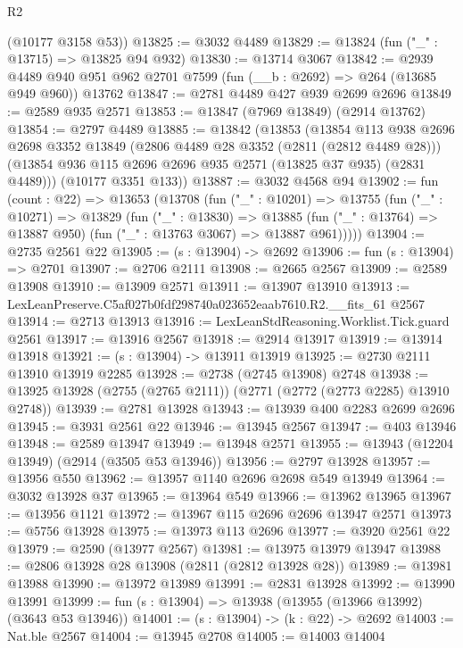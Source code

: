 \begin{lexlean}{R2}
\begin{coremodule}
      (@10177 @3158 @53))
@13825 := @3032 @4489
@13829 := @13824 (fun ("_" : @13715) => @13825 @94 @932)
@13830 := @13714 @3067
@13842 := @2939
    @4489
    @940
    @951
    @962
    @2701
    @7599
    (fun (__b : @2692) => @264 (@13685 @949 @960))
    @13762
@13847 := @2781 @4489 @427 @939 @2699 @2696
@13849 := @2589 @935 @2571
@13853 := @13847 (@7969 @13849) (@2914 @13762)
@13854 := @2797 @4489
@13885 := @13842
    (@13853
      (@13854
        @113
        @938
        @2696
        @2698
        @3352
        @13849
        (@2806 @4489 @28 @3352 (@2811 (@2812 @4489 @28)))
        (@13854 @936 @115 @2696 @2696 @935 @2571 (@13825 @37 @935) (@2831 @4489)))
      (@10177 @3351 @133))
@13887 := @3032 @4568 @94
@13902 := fun (count : @22) =>
  @13653
    (@13708
      (fun ("_" : @10201) =>
      @13755
        (fun ("_" : @10271) =>
        @13829
          (fun ("_" : @13830) =>
          @13885 (fun ("_" : @13764) => @13887 @950) (fun ("_" : @13763 @3067) => @13887 @961)))))
@13904 := @2735 @2561 @22
@13905 := (s : @13904) -> @2692
@13906 := fun (s : @13904) => @2701
@13907 := @2706 @2111
@13908 := @2665 @2567
@13909 := @2589 @13908
@13910 := @13909 @2571
@13911 := @13907 @13910
@13913 := LexLeanPreserve.C5af027b0fdf298740a023652eaab7610.R2.__fits_61 @2567
@13914 := @2713 @13913
@13916 := LexLeanStdReasoning.Worklist.Tick.guard @2561
@13917 := @13916 @2567
@13918 := @2914 @13917
@13919 := @13914 @13918
@13921 := (s : @13904) -> @13911 @13919
@13925 := @2730 @2111 @13910 @13919 @2285
@13928 := @2738 (@2745 @13908) @2748
@13938 := @13925 @13928 (@2755 (@2765 @2111)) (@2771 (@2772 (@2773 @2285) @13910 @2748))
@13939 := @2781 @13928
@13943 := @13939 @400 @2283 @2699 @2696
@13945 := @3931 @2561 @22
@13946 := @13945 @2567
@13947 := @403 @13946
@13948 := @2589 @13947
@13949 := @13948 @2571
@13955 := @13943 (@12204 @13949) (@2914 (@3505 @53 @13946))
@13956 := @2797 @13928
@13957 := @13956 @550
@13962 := @13957 @1140 @2696 @2698 @549 @13949
@13964 := @3032 @13928 @37
@13965 := @13964 @549
@13966 := @13962 @13965
@13967 := @13956 @1121
@13972 := @13967 @115 @2696 @2696 @13947 @2571
@13973 := @5756 @13928
@13975 := @13973 @113 @2696
@13977 := @3920 @2561 @22
@13979 := @2590 (@13977 @2567)
@13981 := @13975 @13979 @13947
@13988 := @2806 @13928 @28 @13908 (@2811 (@2812 @13928 @28))
@13989 := @13981 @13988
@13990 := @13972 @13989
@13991 := @2831 @13928
@13992 := @13990 @13991
@13999 := fun (s : @13904) => @13938 (@13955 (@13966 @13992) (@3643 @53 @13946))
@14001 := (s : @13904) -> (k : @22) -> @2692
@14003 := Nat.ble @2567
@14004 := @13945 @2708
@14005 := @14003 @14004

\end{coremodule}
\end{lexlean}
